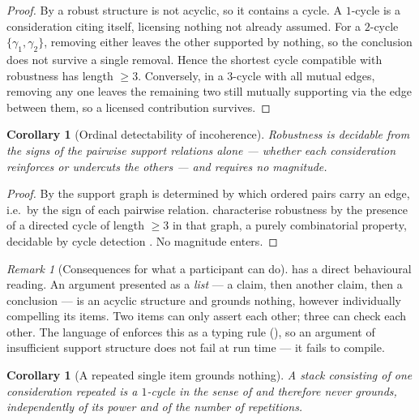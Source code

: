 \documentclass[11pt,a4paper]{article}
\theoremstyle{clstyle}
\newtheorem{corollary}[theorem]{Corollary}
\theoremstyle{definition}
\theoremstyle{remark}
\newtheorem{remark}[theorem]{Remark}
\begin{document}
\begin{proof}
By  a robust structure is not acyclic, so it contains a
cycle. A $1$-cycle is a consideration citing itself, licensing nothing not
already assumed. For a $2$-cycle $\{\gamma_1,\gamma_2\}$, removing either
leaves the other supported by nothing, so the conclusion does not survive a
single removal. Hence the shortest cycle compatible with robustness has
length $\ge3$. Conversely, in a $3$-cycle with all mutual edges, removing any
one leaves the remaining two still mutually supporting via the edge between
them, so a licensed contribution survives.
\end{proof}

\begin{corollary}[Ordinal detectability of incoherence]
\label{cor:ordinal}
Robustness is decidable from the \emph{signs} of the pairwise support
relations alone --- whether each consideration reinforces or undercuts the
others --- and requires no magnitude.
\end{corollary}

\begin{proof}
By  the support graph is determined by which ordered pairs
carry an edge, i.e.\ by the sign of each pairwise relation.
 characterise robustness by the presence of a
directed cycle of length $\ge3$ in that graph, a purely combinatorial
property, decidable by cycle detection \citep{tarjan1972depth}. No magnitude
enters.
\end{proof}

\begin{remark}[Consequences for what a participant can do]
\label{rem:rule-three}
 has a direct behavioural reading. An argument presented as a
\emph{list} --- a claim, then another claim, then a conclusion --- is an
acyclic structure and grounds nothing, however individually compelling its
items. Two items can only assert each other; three can check each other. The
language of  enforces this as a typing rule
(), so an argument of insufficient support structure
does not fail at run time --- it fails to compile.
\end{remark}

\begin{corollary}[A repeated single item grounds nothing]
\label{cor:repeat-nothing}
A stack consisting of one consideration repeated is a $1$-cycle in the sense
of  and therefore never grounds, independently of its
power and of the number of repetitions.
\end{corollary}
\end{document}
